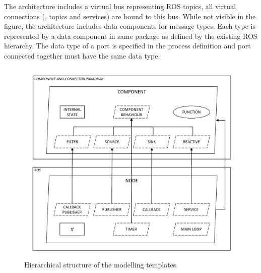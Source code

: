 The architecture includes a virtual bus representing ROS topics, all virtual connections (\ie, topics and services) are bound to this bus. While not visible in the figure, the architecture includes data components for message types. Each type is represented by a data component in same package as defined by the existing ROS hierarchy. The data  type of a port is specified in the process definition and port connected together must have the same data type.

\begin{figure}[t]
    \centering
    \includegraphics[width=\textwidth]{gfx/hierarchy}
    \caption{Hierarchical structure of the modelling templates.}\label{fig:template}
\end{figure}

